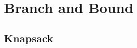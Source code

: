 \documentclass{beamer}
\begin{document}



\section{Branch and Bound}

\subsection{Knapsack}
\end{document}
